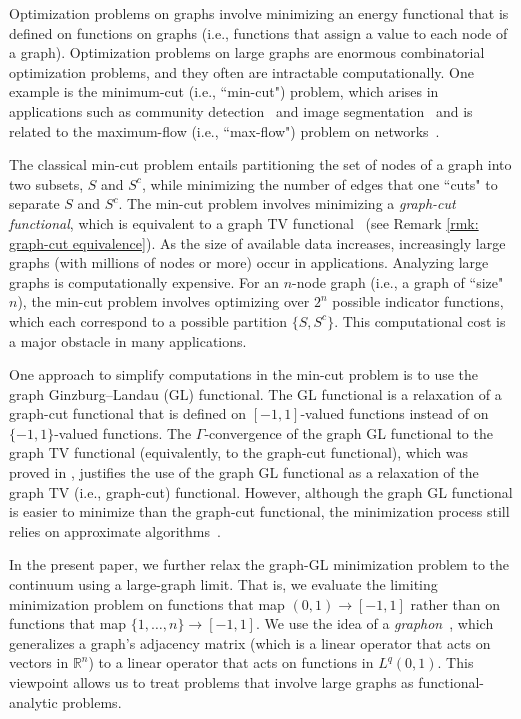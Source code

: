 \documentclass[11pt]{amsart}
\def\R{\mathbb{R}}
\def\ra{\rightarrow}
\numberwithin{equation}{section}
\begin{document}
Optimization problems on graphs involve minimizing an energy functional that is defined on functions on graphs (i.e., functions that assign a value to each node of a graph). Optimization problems on large graphs are enormous combinatorial optimization problems, and they often are intractable computationally. One example is the minimum-cut (i.e., ``min-cut") problem, which arises in applications such as community detection~\cite{newman2018,van2013community} and image segmentation~\cite{rudin1992nonlinear, wu1993optimal, yi2012image, shi2000normalized,szlam2010total} and is related to the maximum-flow (i.e., ``max-flow") problem on networks~\cite{dantzig2003max,yuan2010study, ford1956maximal}.  

The classical min-cut problem entails partitioning the set of nodes of a graph into two subsets, $S$ and $S^c$, while minimizing the number of edges that one ``cuts" to separate $S$ and $S^c$. {The min-cut problem involves minimizing a \textit{graph-cut functional}}, which is equivalent to a graph TV functional~\cite{merkurjev2015global} {(see Remark \ref{rmk: graph-cut equivalence})}. 
As the size of available data increases, increasingly large graphs (with millions of nodes or more) occur in applications. Analyzing large graphs is computationally expensive. For an $n$-node graph (i.e., a graph of ``size" $n$), the min-cut problem involves optimizing over $2^n$ possible indicator functions, which each correspond to a possible partition $\{S, S^c\}$. This computational cost is a major obstacle in many applications. 

One {approach} to simplify computations in the min-cut problem is to use the graph Ginzburg--Landau (GL) functional. The GL functional is a relaxation of a graph-cut functional that is defined on $[-1,1]$-valued functions instead of on $\{-1,1\}$-valued functions. The $\Gamma$-convergence of the graph GL functional to the graph TV functional (equivalently, to the graph-cut functional), which was proved in \cite{van2012gamma}, justifies the use of the graph GL functional as a relaxation of the graph TV (i.e., graph-cut) functional. However, although the graph GL functional is easier to minimize than the graph-cut functional, the minimization process still relies on approximate algorithms~\cite{budd2019mbo, merkurjev2013mbo, van2014mean, bertozzi2016diffuse, shen2023preconditioned}. 

In the present paper, we further relax the graph-GL minimization problem to the continuum using a large-graph limit. That is, we evaluate the limiting minimization problem on functions {that map} $(0,1) \ra [-1,1]$ rather than on functions {that map} $\{1,\ldots, n\} \ra [-1,1]$. We use the idea of a \textit{graphon}~\cite{lovasz2012large}, which generalizes a graph's adjacency matrix (which is a linear operator that acts on vectors in $\R^n$) to a linear operator that acts on functions in $L^q(0,1)$. This viewpoint allows us to treat problems that involve large graphs as functional-analytic problems. 
\end{document}
